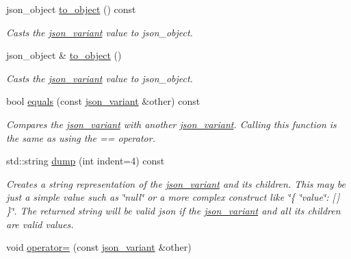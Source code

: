 \begin{DoxyCompactItemize}
json\+\_\+object \hyperlink{classJSONLIB__NAMESPACE_1_1json__variant_a28035668bca7e7829340fe994581564d}{to\+\_\+object} () const
\begin{DoxyCompactList}\small\item\em Casts the \hyperlink{classJSONLIB__NAMESPACE_1_1json__variant}{json\+\_\+variant} value to {\itshape json\+\_\+object}. \end{DoxyCompactList}\item 
json\+\_\+object \& \hyperlink{classJSONLIB__NAMESPACE_1_1json__variant_a05536ef12c8da052e4716087651b43ad}{to\+\_\+object} ()
\begin{DoxyCompactList}\small\item\em Casts the \hyperlink{classJSONLIB__NAMESPACE_1_1json__variant}{json\+\_\+variant} value to {\itshape json\+\_\+object}. \end{DoxyCompactList}\item 
bool \hyperlink{classJSONLIB__NAMESPACE_1_1json__variant_ae68b9cb156c2b2f9e12c7f889634b63a}{equals} (const \hyperlink{classJSONLIB__NAMESPACE_1_1json__variant}{json\+\_\+variant} \&other) const
\begin{DoxyCompactList}\small\item\em Compares the \hyperlink{classJSONLIB__NAMESPACE_1_1json__variant}{json\+\_\+variant} with another \hyperlink{classJSONLIB__NAMESPACE_1_1json__variant}{json\+\_\+variant}. Calling this function is the same as using the {\itshape ==} {\itshape operator}. \end{DoxyCompactList}\item 
std\+::string \hyperlink{classJSONLIB__NAMESPACE_1_1json__variant_a72d4a39d77b76f076354219edc6ea4a0}{dump} (int indent=4) const
\begin{DoxyCompactList}\small\item\em Creates a string representation of the \hyperlink{classJSONLIB__NAMESPACE_1_1json__variant}{json\+\_\+variant} and its children. This may be just a simple value such as \char`\"{}null\char`\"{} or a more complex construct like \char`\"{}\{ \char`\"{}value\char`\"{}\+: \mbox{[}$\,$\mbox{]} \}\char`\"{}. The returned string will be valid json if the \hyperlink{classJSONLIB__NAMESPACE_1_1json__variant}{json\+\_\+variant} and all its children are valid values. \end{DoxyCompactList}\item 
void \hyperlink{classJSONLIB__NAMESPACE_1_1json__variant_acab384801617885ba1dc3b965a456e7e}{operator=} (const \hyperlink{classJSONLIB__NAMESPACE_1_1json__variant}{json\+\_\+variant} \&other)

\end{DoxyCompactItemize}
